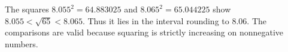 The squares $8.055^2=64.883025$ and $8.065^2=65.044225$ show $8.055<\sqrt{65}<8.065$. Thus it lies in the interval rounding to $\boxed{8.06}$. The comparisons are valid because squaring is strictly increasing on nonnegative numbers.
